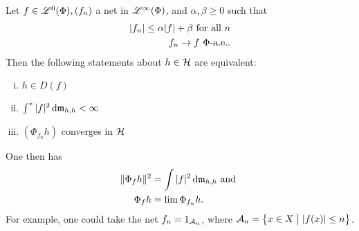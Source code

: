 \begin{lem}
  \label{maintheorem2}
Let $f \in \mathscr{L}^0(\Phi), (f_n)$ a net in $\mathscr{L}^\infty (\Phi)$, and $\alpha, \beta \geq 0$ such that
 \begin{align*}
   | f_n | \leq \alpha |f| + \beta \text{ for all } n \\
   f_n \to f ~\Phi\text{-a.e.}.
 \end{align*}
Then the following statements about $h \in \mathcal{H}$ are equivalent:
\begin{enumerate}[(i)]
 \item $h \in D(f)$
 \item $\int ^{*} | f| ^2 \operatorname{d}\! \mathfrak{m}_{h,h} < \infty$
 \item $(\Phi_{f_n}h)$ converges in $ \mathcal{H}$
\end{enumerate}
One then has
\begin{align*}
  \| \Phi_f h \| ^2 &= \int |f|^2 \operatorname{d}\! \mathfrak{m}_{h, h } \text{ and }\\
  \Phi_{f }h &= \lim \Phi_{f_n} h.
\end{align*}
For example, one could take the net $f_n = 1_{\mathcal{A}_n}$, where $\mathcal{A}_n = \left\lbrace x \in X \bigm | | f(x) | \leq n \right\rbrace$.
\end{lem}

